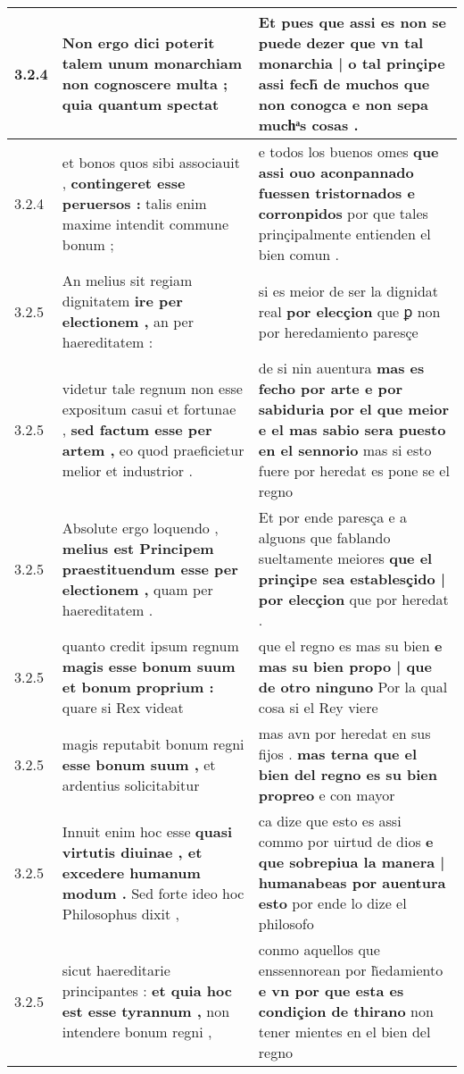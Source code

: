 \begin{tabular}{|p{1cm}|p{6.5cm}|p{6.5cm}|}
3.2.4 & Non ergo dici poterit \textbf{ talem unum monarchiam non cognoscere multa ; } quia quantum spectat & Et pues que assi es non se puede dezer \textbf{ que vn tal monarchia | o tal prinçipe assi fech̃ de muchos que non conogca } e non sepa muchͣs cosas . \\\hline
3.2.4 & et bonos quos sibi associauit , \textbf{ contingeret esse peruersos : } talis enim maxime intendit commune bonum ; & e todos los buenos omes \textbf{ que assi ouo aconpannado fuessen tristornados e corronpidos } por que tales prinçipalmente entienden el bien comun . \\\hline
3.2.5 & An melius sit regiam dignitatem \textbf{ ire per electionem , } an per haereditatem : & si es meior de ser la dignidat real \textbf{ por elecçion } que ꝑ non por heredamiento paresçe \\\hline
3.2.5 & videtur tale regnum non esse expositum casui et fortunae , \textbf{ sed factum esse per artem , } eo quod praeficietur melior et industrior . & de si nin auentura \textbf{ mas es fecho por arte e por sabiduria por el que meior e el mas sabio sera puesto en el sennorio } mas si esto fuere por heredat es pone se el regno \\\hline
3.2.5 & Absolute ergo loquendo , \textbf{ melius est Principem praestituendum esse per electionem , } quam per haereditatem . & Et por ende paresça e a alguons que fablando sueltamente meiores \textbf{ que el prinçipe sea establesçido | por elecçion } que por heredat . \\\hline
3.2.5 & quanto credit ipsum regnum \textbf{ magis esse bonum suum et bonum proprium : } quare si Rex videat & que el regno es mas su bien \textbf{ e mas su bien propo | que de otro ninguno } Por la qual cosa si el Rey viere \\\hline
3.2.5 & magis reputabit bonum regni \textbf{ esse bonum suum , } et ardentius solicitabitur & mas avn por heredat en sus fijos . \textbf{ mas terna que el bien del regno es su bien propreo } e con mayor \\\hline
3.2.5 & Innuit enim hoc esse \textbf{ quasi virtutis diuinae , et excedere humanum modum . } Sed forte ideo hoc Philosophus dixit , & ca dize que esto es assi commo por uirtud de dios \textbf{ e que sobrepiua la manera | humanabeas por auentura esto } por ende lo dize el philosofo \\\hline
3.2.5 & sicut haereditarie principantes : \textbf{ et quia hoc est esse tyrannum , } non intendere bonum regni , & conmo aquellos que enssennorean por h̃edamiento \textbf{ e vn por que esta es condiçion de thirano } non tener mientes en el bien del regno \\\hline

\end{tabular}
